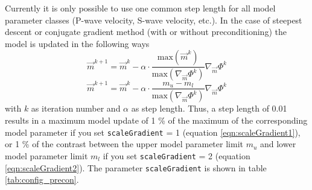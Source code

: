 \documentclass[pdftex,a4paper,parskip,listof=totoc,bibliography=totoc,onehalfspacing,12pt]{scrreprt}
\begin{document}
Currently it is only possible to use one common step length for all model parameter classes (P-wave velocity, S-wave velocity, etc.). In the case of steepest descent or conjugate gradient method (with or without preconditioning) the model is updated in the following ways
\begin{equation}
\label{eqn:scaleGradient1}
 \vec{m}^{k+1} = \vec{m}^k - \alpha \cdot \frac{\mathrm{max}(\vec{m}^k)}{\mathrm{max}(\nabla_{\vec{m}} \Phi^k)} \nabla_{\vec{m}} \Phi^k   
\end{equation}
\begin{equation}
\label{eqn:scaleGradient2}
 \vec{m}^{k+1} = \vec{m}^k - \alpha \cdot \frac{m_u-m_l}{\mathrm{max}(\nabla_{\vec{m}} \Phi^k)} \nabla_{\vec{m}} \Phi^k   
\end{equation}
with $k$ as iteration number and $\alpha$ as step length. Thus, a step length of 0.01 results in a maximum model update of 1 \% of the maximum of the corresponding model parameter if you set \verb+scaleGradient+ = 1 (equation \ref{eqn:scaleGradient1}), or 1 \% of the contrast between the upper model parameter limit $m_u$ and lower model parameter limit $m_l$ if you set \verb+scaleGradient+ = 2 (equation \ref{eqn:scaleGradient2}). The parameter \verb+scaleGradient+ is shown in table \ref{tab:config_precon}.
\end{document}
